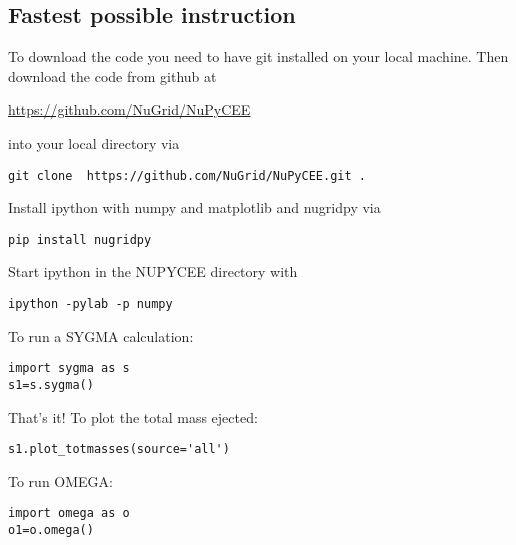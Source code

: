 
\subsection{Fastest possible instruction}

To download the code
you need to have git installed on your local machine.
Then download the code from github at

\url{https://github.com/NuGrid/NuPyCEE}

into your local directory via

\begin{verbatim}
git clone  https://github.com/NuGrid/NuPyCEE.git .
\end{verbatim}

Install ipython with numpy and matplotlib and
nugridpy via

\begin{verbatim}
pip install nugridpy
\end{verbatim}

Start ipython in the NUPYCEE directory with

\begin{verbatim}
ipython -pylab -p numpy
\end{verbatim}

To run a SYGMA calculation:

\begin{verbatim}
import sygma as s
s1=s.sygma()
\end{verbatim}

That's it! To plot the total  mass ejected:

\begin{verbatim}
s1.plot_totmasses(source='all')	
\end{verbatim}


To run OMEGA:

\begin{verbatim}
import omega as o
o1=o.omega()
\end{verbatim}

